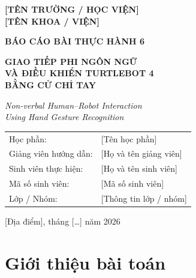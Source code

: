 \documentclass[12pt,a4paper]{article}
\begin{document}
\hypersetup{pageanchor=false}
\begin{titlepage}
\thispagestyle{empty}
\centering
{\large\bfseries [TÊN TRƯỜNG / HỌC VIỆN]\\[5pt] [TÊN KHOA / VIỆN]}\par
\vspace{1.5cm}
{\Large\bfseries BÁO CÁO BÀI THỰC HÀNH 6}\par
\vspace{0.7cm}
{\LARGE\bfseries\color{navy} GIAO TIẾP PHI NGÔN NGỮ\\[7pt] VÀ ĐIỀU KHIỂN TURTLEBOT 4\\[7pt] BẰNG CỬ CHỈ TAY}\par
\vspace{0.6cm}
{\large\itshape Non-verbal Human--Robot Interaction\\ Using Hand Gesture Recognition}\par
\vspace{1.6cm}
\begin{tabular}{@{}ll@{}}
Học phần: & [Tên học phần]\\[9pt]
Giảng viên hướng dẫn: & [Họ và tên giảng viên]\\[9pt]
Sinh viên thực hiện: & [Họ và tên sinh viên]\\[9pt]
Mã số sinh viên: & [Mã số sinh viên]\\[9pt]
Lớp / Nhóm: & [Thông tin lớp / nhóm]
\end{tabular}
\vfill
{\large [Địa điểm], tháng [\ldots] năm 2026}\par
\vspace{0.4cm}
\end{titlepage}
\hypersetup{pageanchor=true}
{\setlength{\parskip}{0pt}\renewcommand{\baselinestretch}{0.96}\footnotesize\tableofcontents}
\clearpage
{}

\section{Giới thiệu bài toán}
\end{document}
